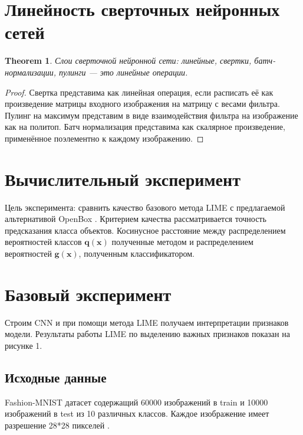 \documentclass[12pt]{article}
\begin{document}
\section{Линейность сверточных нейронных сетей}

\newtheorem{theorem}{Theorem}
\begin{theorem}
Слои сверточной нейронной сети: линейные, свертки, батч-нормализации, пулинги --- это линейные операции.
\end{theorem}

\begin{proof}
Свертка представима как линейная операция, если расписать её как произведение матрицы входного изображения на матрицу с весами фильтра. Пулинг на максимум представим в виде взаимодействия фильтра на изображение как на политоп. Батч нормализация представима как скалярное произведение, применённое поэлементно к каждому изображению.
\end{proof}

\section{Вычислительный эксперимент}

Цель эксперимента: сравнить качество базового метода LIME \cite{ribeiro2016why} с предлагаемой альтернативой OpenBox \cite{chu2019exact}. Критерием качества рассматривается точность предсказания класса объектов. Косинусное расстояние между распределением вероятностей классов $\mathbf{q}(\mathbf{x})$ полученные методом и распределением вероятностей $\mathbf{g}(\mathbf{x})$, полученным классификатором.

\section{Базовый эксперимент}


Строим CNN и при помощи метода LIME \cite{ribeiro2016why} получаем интерпретации признаков модели. Результаты работы LIME по выделению важных признаков показан на рисунке 1.

\subsection{Исходные данные}

  Fashion-MNIST датасет содержащий 60000 изображений в train и 10000 изображений в test из 10 различных классов. Каждое изображение имеет разрешение 28*28 пикселей  \citep{fashionmnist}.
\end{document}
